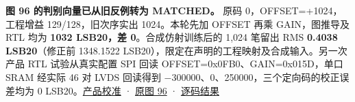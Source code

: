 \documentclass[UTF8,fontset=none,zihao=-4,a4paper]{ctexart}
\begin{document}
\textbf{图 96 的判别向量已从旧反例转为 MATCHED。} 原码 0，OFFSET=\relax{}+\relax{}1024，工程增益 129/128，旧次序实出 1024。本轮先加 OFFSET 再乘 GAIN，图推导及 RTL 均为 \textbf{1032 LSB20，差 0}。合成仿射训练后的 1,024 笔留出 RMS \textbf{0.4038 LSB20}（修正前 1348.\relax{}1522 LSB20），限定在声明的工程映射及合成输入。另一次产品 RTL 试验从真实配置 SPI 回读 OFFSET=\relax{}0x0FB0、\allowbreak{}GAIN=\relax{}0x015D，单口 SRAM 经实际 46 对 LVDS 回读得到 −300000、\allowbreak{}0、\allowbreak{}250000，三个定向码的校正误差均为 0 LSB20。\href{https://github.com/defineiocc02/20bit\_SAR\_ADC\_Behaviour\_Verification/blob/feat/ad4080-peripherals/subsys/ad4080\_peripherals/integration/product/evidence/calibration.txt}{产品校准} · \href{https://www.analog.com/media/en/technical-documentation/data-sheets/ad4080.pdf\#page=64}{原图 96} · \href{https://github.com/defineiocc02/20bit\_SAR\_ADC\_Behaviour\_Verification/blob/feat/ad4080-peripherals/subsys/ad4080\_peripherals/calibration/rtl\_verification.json}{逐码结果}\par
\end{document}
